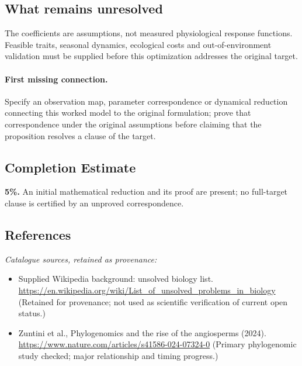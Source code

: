 \documentclass[11pt]{article}
\begin{document}
\subsection{What remains unresolved}
The coefficients are assumptions, not measured physiological response functions. Feasible traits, seasonal dynamics, ecological costs and out-of-environment validation must be supplied before this optimization addresses the original target.
\paragraph{First missing connection.} Specify an observation map, parameter correspondence or dynamical reduction connecting this worked model to the original formulation; prove that correspondence under the original assumptions before claiming that the proposition resolves a clause of the target.
\subsection{Completion Estimate}
\textbf{5\%.} An initial mathematical reduction and its proof are present; no full-target clause is certified by an unproved correspondence.
\subsection{References}
\noindent\emph{Catalogue sources, retained as provenance:}
\begin{itemize}
\item Supplied Wikipedia background: unsolved biology list. \url{https://en.wikipedia.org/wiki/List_of_unsolved_problems_in_biology} (Retained for provenance; not used as scientific verification of current open status.)
\item Zuntini et al., Phylogenomics and the rise of the angiosperms (2024). \url{https://www.nature.com/articles/s41586-024-07324-0} (Primary phylogenomic study checked; major relationship and timing progress.)
\end{itemize}
\clearpage


\appendix
\end{document}
